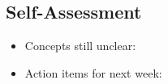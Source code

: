 \documentclass[12pt]{article}
\begin{document}
\begin{center}
\begin{minipage}[t][\textheight]{\textwidth}
  \subsection*{Self-Assessment}
  \begin{itemize}[noitemsep]
    \item Concepts still unclear:
    \item Action items for next week:
  \end{itemize}

\end{minipage}
\end{center}
\end{document}
